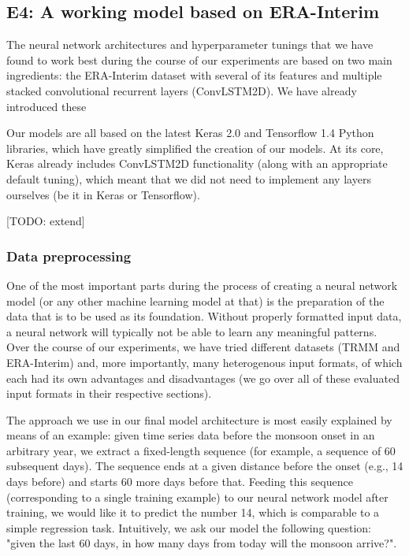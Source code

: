 \subsection{E4: A working model based on ERA-Interim}
\label{sst:final_model}
The neural network architectures and hyperparameter tunings that we have found to work best during the course of our experiments are based on two main ingredients: the ERA-Interim dataset with several of its features and multiple stacked convolutional recurrent layers (ConvLSTM2D). We have already introduced these

Our models are all based on the latest Keras 2.0 and Tensorflow 1.4 Python libraries, which have greatly simplified the creation of our models. At its core, Keras already includes ConvLSTM2D functionality (along with an appropriate default tuning), which meant that we did not need to implement any layers ourselves (be it in Keras or Tensorflow).

[TODO: extend]

\subsubsection{Data preprocessing}
One of the most important parts during the process of creating a neural network model (or any other machine learning model at that) is the preparation of the data that is to be used as its foundation. Without properly formatted input data, a neural network will typically not be able to learn any meaningful patterns. Over the course of our experiments, we have tried different datasets (TRMM and ERA-Interim) and, more importantly, many heterogenous input formats, of which each had its own advantages and disadvantages (we go over all of these evaluated input formats in their respective sections).

The approach we use in our final model architecture is most easily explained by means of an example: given time series data before the monsoon onset in an arbitrary year, we extract a fixed-length sequence (for example, a sequence of 60 subsequent days). The sequence ends at a given distance before the onset (e.g., 14 days before) and starts 60 more days before that. Feeding this sequence (corresponding to a single training example) to our neural network model after training, we would like it to predict the number 14, which is comparable to a simple regression task. Intuitively, we ask our model the following question: "given the last 60 days, in how many days from today will the monsoon arrive?".

